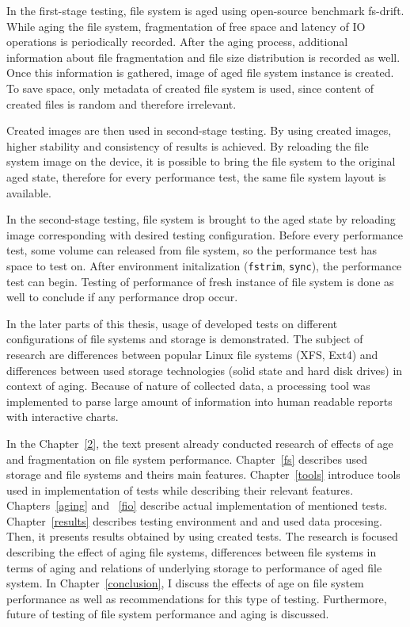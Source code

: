 \documentclass[
  color, %
  table, %
  lof,   %
  lot,   %
]{fithesis3}
\begin{document}
In the first-stage testing, file system is aged using open-source benchmark fs-drift. While aging the file system, fragmentation of free space and latency of IO operations is periodically recorded. After the aging process, additional information about file fragmentation and file size distribution is recorded as well. Once this information is gathered, image of aged file system instance is created. To save space, only metadata of created file system is used, since content of created files is random and therefore irrelevant.

Created images are then used in second-stage testing. By using created images, higher stability and consistency of results is achieved. By reloading the file system image on the device, it is possible to bring the file system to the original aged state, therefore for every performance test, the same file system layout is available.

In the second-stage testing, file system is brought to the aged state by reloading image corresponding with desired testing configuration. Before every performance test, some volume can released from file system, so the performance test has space to test on. After environment initalization (\texttt{fstrim}, \texttt{sync}), the performance test can begin. Testing of performance of fresh instance of file system is done as well to conclude if any performance drop occur.

In the later parts of this thesis, usage of developed tests on different configurations of file systems and storage is demonstrated. The subject of research are differences between popular Linux file systems (XFS, Ext4) and differences between used storage technologies (solid state and hard disk drives) in context of aging. Because of nature of collected data, a processing tool was implemented to parse large amount of information into human readable reports with interactive charts.

In the Chapter~\ref{2}, the text present already conducted research of effects of age and fragmentation on file system performance. Chapter~\ref{fs} describes used storage and file systems and theirs main features. Chapter~\ref{tools} introduce tools used in implementation of tests while describing their relevant features. Chapters~\ref{aging} and ~\ref{fio} describe actual implementation of mentioned tests. Chapter~\ref{results} describes testing environment and and used data procesing. Then, it presents results obtained by using created tests. The research is focused describing the effect of aging file systems, differences between file systems in terms of aging and relations of underlying storage to performance of aged file system. In Chapter~\ref{conclusion}, I discuss the effects of age on file system performance as well as recommendations for this type of testing. Furthermore, future of testing of file system performance and aging is discussed.
\end{document}
